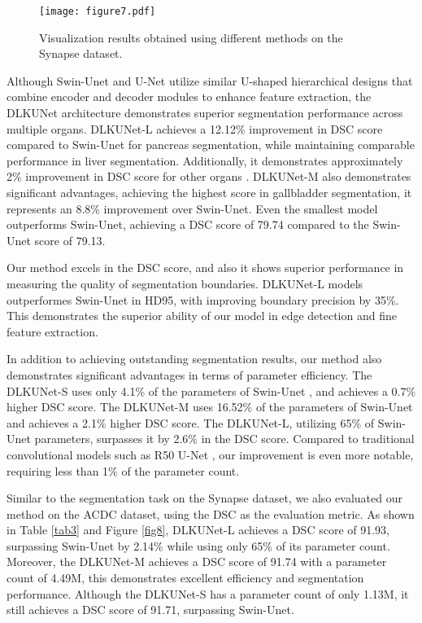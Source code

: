 \documentclass[sn-mathphys-num]{sn-jnl}
\theoremstyle{thmstyleone}%
\theoremstyle{thmstyletwo}%
\theoremstyle{thmstylethree}%
\begin{document}
\begin{figure}[h]
    \centering
    \texttt{[image: figure7.pdf]}
    \caption{Visualization results obtained using different methods on the Synapse dataset.}\label{fig7}
\end{figure}

Although Swin-Unet \cite{cao2022swin} and U-Net \cite{ronneberger2015u} utilize similar U-shaped hierarchical designs that combine encoder and decoder modules to enhance feature extraction,
the DLKUNet architecture demonstrates superior segmentation performance across multiple organs.
DLKUNet-L achieves a 12.12\% improvement in DSC score compared to Swin-Unet for pancreas segmentation, while maintaining comparable performance in liver segmentation.
Additionally, it demonstrates approximately 2\% improvement in DSC score for other organs \cite{cao2022swin}.
DLKUNet-M also demonstrates significant advantages, achieving the highest score in gallbladder segmentation, it represents an 8.8\% improvement over Swin-Unet.
Even the smallest model outperforms Swin-Unet, achieving a DSC score of 79.74 compared to the Swin-Unet score of 79.13.

Our method excels in the DSC score, and also it shows superior performance in measuring the quality of segmentation boundaries.
DLKUNet-L models outperformes Swin-Unet \cite{cao2022swin} in HD95, with improving boundary precision by 35\%.
This demonstrates the superior ability of our model in edge detection and fine feature extraction.

In addition to achieving outstanding segmentation results, our method also demonstrates significant advantages in terms of parameter efficiency.
The DLKUNet-S uses only 4.1\% of the parameters of Swin-Unet \cite{cao2022swin}, and achieves a 0.7\% higher DSC score.
The DLKUNet-M uses 16.52\% of the parameters of Swin-Unet and achieves a 2.1\% higher DSC score.
The DLKUNet-L, utilizing 65\% of Swin-Unet parameters, surpasses it by 2.6\% in the DSC score.
Compared to traditional convolutional models such as R50 U-Net \cite{chen2021transunet}, our improvement is even more notable, requiring less than 1\% of the parameter count.

Similar to the segmentation task on the Synapse dataset, we also evaluated our method on the ACDC dataset, using the DSC as the evaluation metric.
As shown in Table \ref{tab3} and Figure \ref{fig8}, DLKUNet-L achieves a DSC score of 91.93, surpassing Swin-Unet \cite{cao2022swin} by 2.14\% while using only 65\% of its parameter count.
Moreover, the DLKUNet-M achieves a DSC score of 91.74 with a parameter count of 4.49M, this demonstrates excellent efficiency and segmentation performance.
Although the DLKUNet-S has a parameter count of only 1.13M, it still achieves a DSC score of 91.71, surpassing Swin-Unet.
\end{document}
